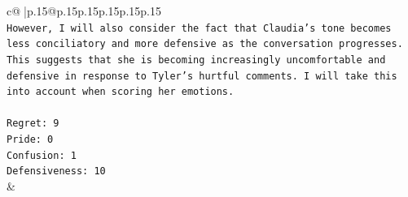 \documentclass{article}
\begin{document}
{\begin{supertabular}{c@{$\;$}|p{.15\linewidth}@{}p{.15\linewidth}p{.15\linewidth}p{.15\linewidth}p{.15\linewidth}p{.15\linewidth}}
{{{\\ 
\texttt{However, I will also consider the fact that Claudia's tone becomes less conciliatory and more defensive as the conversation progresses. This suggests that she is becoming increasingly uncomfortable and defensive in response to Tyler's hurtful comments. I will take this into account when scoring her emotions.} \\
\\ 
\texttt{Regret: 9} \\
\texttt{Pride: 0} \\
\texttt{Confusion: 1} \\
\texttt{Defensiveness: 10} \\
            }
        }
    }
    & \\ \\

\end{supertabular}
}
\end{document}
